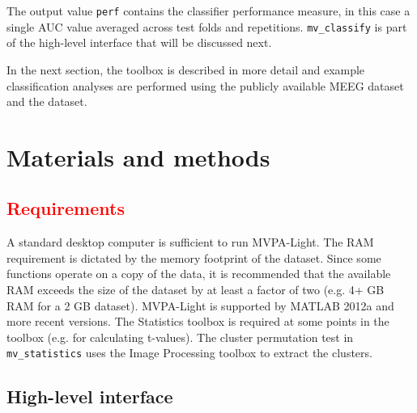 \documentclass[utf8]{frontiersSCNS} %
\newcommand{\ttt}[1]{\texttt{#1}}
\newcommand{\red}[1]{\textcolor{red}{#1}}
\begin{document}
The output value \ttt{perf} contains the classifier performance measure, in this case a single AUC value averaged across test folds and repetitions. \ttt{mv\_classify} is part of the high-level interface that will be discussed next.

In the next section, the toolbox is described in more detail and example classification analyses are performed using the publicly available \cite{Wakeman2014OpenfMRI,Wakeman2015ADataset} MEEG dataset and the \cite{Haxby2001} dataset.

\section{Materials and methods}

\red{\subsection{Requirements}}

A standard desktop computer is sufficient to run MVPA-Light. The RAM requirement is dictated by the memory footprint of the dataset. Since some functions operate on a copy of the data, it is recommended that the available RAM exceeds the size of the dataset by at least a factor of two (e.g. 4+ GB RAM for a 2 GB dataset). MVPA-Light is supported by MATLAB 2012a and more recent versions. The Statistics toolbox is required at some points in the toolbox (e.g. for calculating t-values). The cluster permutation test in \ttt{mv\_statistics} uses the Image Processing toolbox to extract the clusters.

\subsection{High-level interface}
\end{document}
